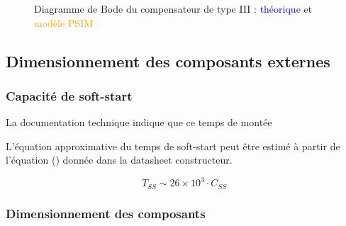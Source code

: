				\begin{figure}[h]
					\begin{center}
					\end{center}
					\label{bode_comp_III}
					\caption{Diagramme de Bode du compensateur de type III : 
					\textcolor{blue}{théorique} et 
					\textcolor{orange}{modèle PSIM}}
				\end{figure}
					
		\subsection{Dimensionnement des composants externes}
			
			\subsubsection{Capacité de soft-start}
			\label{sec:dim_soft_start}
			
			La documentation technique indique que ce temps de montée 
				
			L'équation approximative du temps de soft-start peut être estimé 
			à partir de l'équation () donnée dans la datasheet constructeur.
			
			\cite{Soft_Start}
				
			\begin{equation}
				T_{SS}\sim 26\times 10^3\cdot C_{SS}
			\end{equation}
				
			\subsubsection{Dimensionnement des composants}
				
